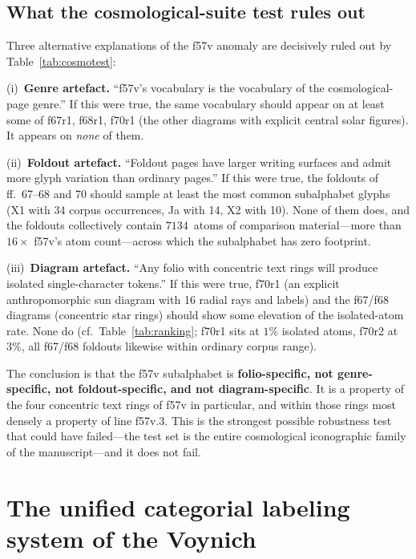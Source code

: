 \subsection{What the cosmological-suite test rules out}
\label{sec:f70r_meaning}

Three alternative explanations of the f57v anomaly are decisively ruled out
by Table~\ref{tab:cosmotest}:

\noindent (i)~\textbf{Genre artefact.} ``f57v's vocabulary is the vocabulary
of the cosmological-page genre.'' If this were true, the same vocabulary
should appear on at least some of f67r1, f68r1, f70r1 (the other diagrams
with explicit central solar figures). It appears on \emph{none} of them.

\noindent (ii)~\textbf{Foldout artefact.} ``Foldout pages have larger writing
surfaces and admit more glyph variation than ordinary pages.'' If this were
true, the foldouts of ff.~67--68 and 70 should sample at least the most
common subalphabet glyphs (X1 with 34 corpus occurrences, Ja with 14, X2 with
10). None of them does, and the foldouts collectively contain $7134$~atoms
of comparison material---more than $16\times$ f57v's atom count---across
which the subalphabet has zero footprint.

\noindent (iii)~\textbf{Diagram artefact.} ``Any folio with concentric text
rings will produce isolated single-character tokens.'' If this were true,
f70r1 (an explicit anthropomorphic sun diagram with 16 radial rays and
labels) and the f67/f68 diagrams (concentric star rings) should show some
elevation of the isolated-atom rate. None do (cf.\ Table~\ref{tab:ranking};
f70r1 sits at $1\%$ isolated atoms, f70r2 at $3\%$, all f67/f68 foldouts
likewise within ordinary corpus range).

The conclusion is that the f57v subalphabet is \textbf{folio-specific, not
genre-specific, not foldout-specific, and not diagram-specific}. It is a
property of the four concentric text rings of f57v in particular, and within
those rings most densely a property of line f57v.3. This is the strongest
possible robustness test that could have failed---the test set is the entire
cosmological iconographic family of the manuscript---and it does not fail.


\section{The unified categorial labeling system of the Voynich}
\label{sec:unified}

